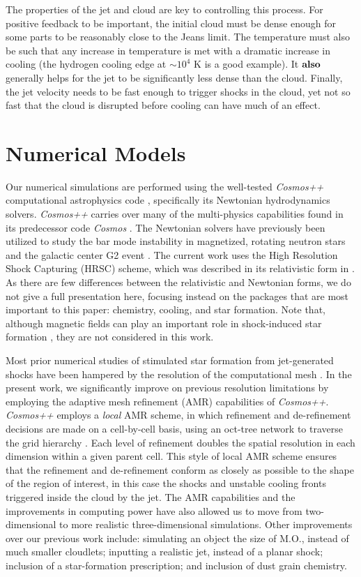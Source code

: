 \documentclass{aastex6}
\begin{document}
The properties of the jet and cloud are key to controlling this process.  For positive feedback to be important, the initial cloud must be dense enough for some parts to be reasonably close to the Jeans limit.  The temperature must also be such that any increase in temperature is met with a dramatic increase in cooling (the hydrogen cooling edge at $\sim 10^4$ K is a good example).  It $\bf{also}$ generally helps for the jet to be significantly less dense than the cloud.  Finally, the jet velocity needs to be fast enough to trigger shocks in the cloud, yet not so fast that the cloud is disrupted before cooling can have much of an effect.


\section{Numerical Models}

Our numerical simulations are performed using the well-tested {\em Cosmos++} computational astrophysics code \citep{Anninos05}, specifically its Newtonian hydrodynamics solvers.  {\em Cosmos++} carries over many of the multi-physics capabilities found in its predecessor code {\em Cosmos} \citep{Anninos03}.  The Newtonian solvers have previously been utilized to study the bar mode instability in magnetized, rotating neutron stars \citep{Camarda09} and the galactic center G2 event \citep{Anninos12}.  The current work uses the High Resolution Shock Capturing (HRSC) scheme, which was described in its relativistic form in \citet{Fragile12}.  As there are few differences between the relativistic and Newtonian forms, we do not give a full presentation here, focusing instead on the packages that are most important to this paper: chemistry, cooling, and star formation. Note that, although magnetic fields can play an important role in shock-induced star formation \citep[cf.][]{Fragile05}, they are not considered in this work.

Most prior numerical studies of stimulated star formation from jet-generated shocks have been hampered by the resolution of the computational mesh \citep[e.g.][]{Fragile04}.  In the present work, we significantly improve on previous resolution limitations by employing the adaptive mesh refinement (AMR) capabilities of {\em Cosmos++}.  {\em Cosmos++} employs a {\em local} AMR scheme, in which refinement and de-refinement decisions are made on a cell-by-cell basis, using an oct-tree network to traverse the grid hierarchy \citep{Anninos05}.  Each level of refinement doubles the spatial resolution in each dimension within a given parent cell.  This style of local AMR scheme ensures that the refinement and de-refinement conform as closely as possible to the shape of the region of interest, in this case the shocks and unstable cooling fronts triggered inside the cloud by the jet. The AMR capabilities and the improvements in computing power have also allowed us to move from two-dimensional to more realistic three-dimensional simulations. Other improvements over our previous work include: simulating an object the size of M.O., instead of much smaller cloudlets; inputting a realistic jet, instead of a planar shock; inclusion of a star-formation prescription; and inclusion of dust grain chemistry.
\end{document}
